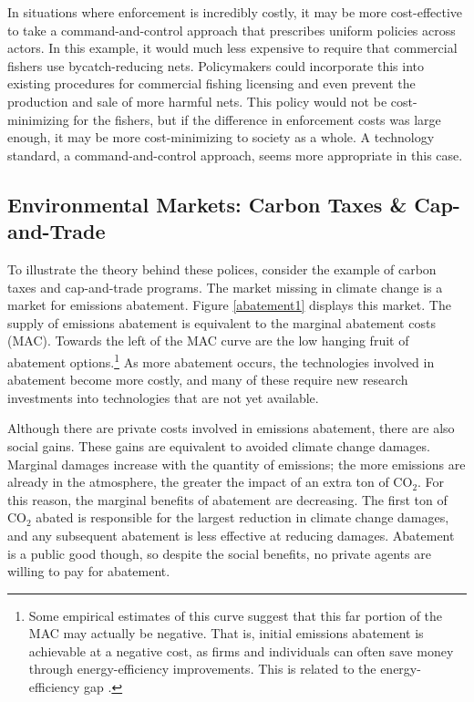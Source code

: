 In situations where enforcement is incredibly costly, it may be more cost-effective to take a command-and-control approach that prescribes uniform policies across actors. In this example, it would much less expensive to require that commercial fishers use bycatch-reducing nets. Policymakers could incorporate this into existing procedures for commercial fishing licensing and even prevent the production and sale of more harmful nets. This policy would not be cost-minimizing for the fishers, but if the difference in enforcement costs was large enough, it may be more cost-minimizing to society as a whole. A technology standard, a command-and-control approach, seems more appropriate in this case.


\subsection{Environmental Markets: Carbon Taxes \& Cap-and-Trade}

To illustrate the theory behind these polices, consider the example of carbon taxes and cap-and-trade programs. The market missing in climate change is a market for emissions abatement. Figure \ref{abatement1} displays this market. The supply of emissions abatement is equivalent to the marginal abatement costs (MAC). Towards the left of the MAC curve are the low hanging fruit of abatement options.\footnote{Some empirical estimates of this curve suggest that this far portion of the MAC may actually be negative. That is, initial emissions abatement is achievable at a negative cost, as firms and individuals can often save money through energy-efficiency improvements. This is related to the energy-efficiency gap \citep[see][]{allcott2012there, gerarden2017assessing}.} As more abatement occurs, the technologies involved in abatement become more costly, and many of these require new research investments into technologies that are not yet available. 

Although there are private costs involved in emissions abatement, there are also social gains. These gains are equivalent to avoided climate change damages. Marginal damages increase with the quantity of emissions; the more emissions are already in the atmosphere, the greater the impact of an extra ton of CO$_2$. For this reason, the marginal benefits of abatement are decreasing. The first ton of CO$_2$ abated is responsible for the largest reduction in climate change damages, and any subsequent abatement is less effective at reducing damages. Abatement is a public good though, so despite the social benefits, no private agents are willing to pay for abatement. 

